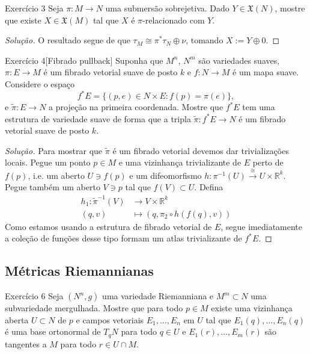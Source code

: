 \begin{thing4}{Exercício 3}\label{exer:3}\leavevmode
Seja \(\pi:M \to N\) uma submersão sobrejetiva. Dado \(Y \in \mathfrak{X}(N)\), mostre que existe \(X \in \mathfrak{X}(M)\) tal que \(X\) é \(\pi\)-relacionado com \(Y\).
\end{thing4}
\begin{proof}[Solução]\leavevmode
O resultado segue de que \(\tau_M\cong\pi^*\tau_N\oplus \nu\), tomando \(X:=Y\oplus 0\).
\end{proof}

\begin{thing4}{Exercício 4}[Fibrado pullback]\label{exer:4}\leavevmode
Suponha que \(M^n\), \(N^m\) são variedades suaves, \(\pi:E \to M\) é um fibrado vetorial suave de posto \(k\) e \(f:N \to M\) é um mapa suave. Considere o espaço
\[f^*E=\{(p,e) \in N \times E:f(p)=\pi(e)\},\]
e \(\tilde{\pi}:E \to N\) a projeção na primeira coordenada. Mostre que \(f^*E\) tem uma estrutura de variedade suave de forma que a tripla \(\tilde{\pi}:f^*E\to N\) é um fibrado vetorial suave de posto \(k\).
\end{thing4}

\begin{proof}[Solução]\leavevmode
Para mostrar que \(\tilde{\pi}\) é um fibrado vetorial devemos dar trivializações locais. Pegue um ponto \(p \in M\) e uma vizinhança trivializante de \(E\) perto de \(f(p)\), i.e. um aberto \(U \ni f(p)\) e um difeomorfismo \(h:\pi^{-1}(U)\xrightarrow{\cong}U\times \mathbb{R}^k\). Pegue também um aberto \(V \ni p\) tal que \(f(V) \subset U\). Defina
\begin{align*}
	h_1: \tilde{\pi}^{-1}(V) &\longrightarrow V \times \mathbb{R}^k \\
	(q,v) &\longmapsto (q,\pi_2\circ h(f(q),v))
\end{align*}
Como estamos usando a estrutura de fibrado vetorial de \(E\), segue imediatamente a coleção de funções desse tipo formam um atlas trivializante de \(f^*E\).
\end{proof}

\subsection{Métricas Riemannianas}

\begin{thing4}{Exercício 6}\label{exer:6}\leavevmode
Seja \((N^n,g)\) uma variedade Riemanniana e \(M^m \subset N\) uma subvariedade mergulhada. Mostre que para todo \(p \in M\) existe uma vizinhança aberta \(U \subset N\) de \(p\) e campos vetoriais \(E_1,\ldots,E_n\) em \(U\) tal que \(E_1(q),\ldots,E_n(q)\) é uma base ortonormal de \(T_q N\) para todo \(q \in U\) e \(E_1(r),\ldots,E_m(r)\) são tangentes a \(M\) para todo \(r \in U \cap M\).
\end{thing4}

